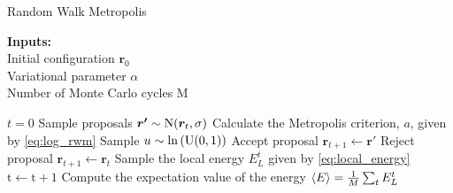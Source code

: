 \begin{algorithm}[H]
\caption{Random Walk Metropolis}\label{algo:rmw}
\hspace*{\algorithmicindent} \textbf{Inputs:} \\
\hspace*{\algorithmicindent} Initial configuration $\bm{r}_0$ \\
\hspace*{\algorithmicindent} Variational parameter $\alpha$ \\
\hspace*{\algorithmicindent} Number of Monte Carlo cycles $\mathrm{M}$
\begin{algorithmic}[1]
\State $t=0$
\Repeat 
    \State Sample proposals $\bm{r'} \sim \mathrm{N}\qty(\bm{r}_t,\sigma)$
    \State Calculate the Metropolis criterion, $a$, given by \autoref{eq:log_rwm} 
    \State Sample $u \sim \ln{\qty(\mathrm{U}(0, 1))}$
        \State Accept proposal $\bm{r}_{t+1} \gets \bm{r'}$
    \Else
        \State Reject proposal $\bm{r}_{t+1} \gets\bm{r}_t$
    \EndIf
    \State Sample the local energy $E_L^t$ given by \autoref{eq:local_energy}
    \State $\mathrm{t}\gets\mathrm{t}+1$
\State Compute the expectation value of the energy $\expval{E} = \frac{1}{M} \sum_t E_L^t$
\end{algorithmic}
\end{algorithm}





